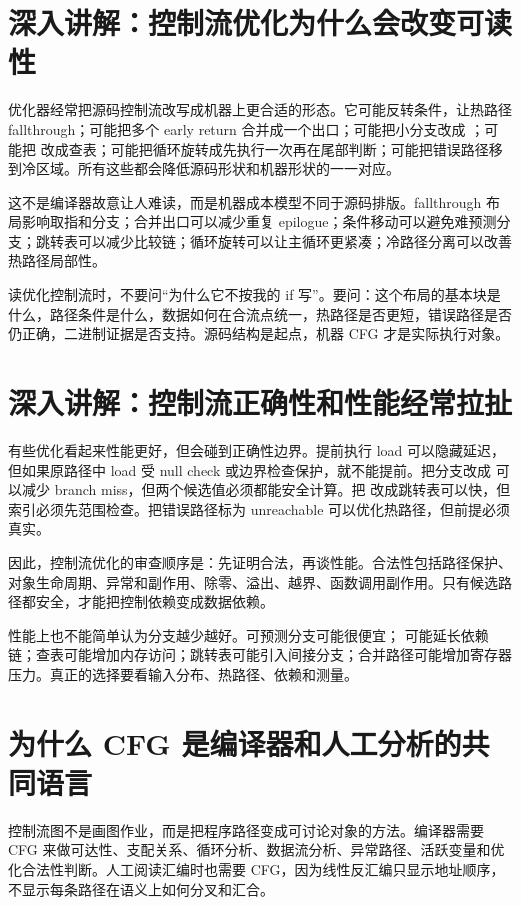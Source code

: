 \section{深入讲解：控制流优化为什么会改变可读性}

优化器经常把源码控制流改写成机器上更合适的形态。它可能反转条件，让热路径 fallthrough；可能把多个 early return 合并成一个出口；可能把小分支改成 ；可能把  改成查表；可能把循环旋转成先执行一次再在尾部判断；可能把错误路径移到冷区域。所有这些都会降低源码形状和机器形状的一一对应。

这不是编译器故意让人难读，而是机器成本模型不同于源码排版。fallthrough 布局影响取指和分支；合并出口可以减少重复 epilogue；条件移动可以避免难预测分支；跳转表可以减少比较链；循环旋转可以让主循环更紧凑；冷路径分离可以改善热路径局部性。

读优化控制流时，不要问“为什么它不按我的 if 写”。要问：这个布局的基本块是什么，路径条件是什么，数据如何在合流点统一，热路径是否更短，错误路径是否仍正确，二进制证据是否支持。源码结构是起点，机器 CFG 才是实际执行对象。

\section{深入讲解：控制流正确性和性能经常拉扯}

有些优化看起来性能更好，但会碰到正确性边界。提前执行 load 可以隐藏延迟，但如果原路径中 load 受 null check 或边界检查保护，就不能提前。把分支改成  可以减少 branch miss，但两个候选值必须都能安全计算。把  改成跳转表可以快，但索引必须先范围检查。把错误路径标为 unreachable 可以优化热路径，但前提必须真实。

因此，控制流优化的审查顺序是：先证明合法，再谈性能。合法性包括路径保护、对象生命周期、异常和副作用、除零、溢出、越界、函数调用副作用。只有候选路径都安全，才能把控制依赖变成数据依赖。

性能上也不能简单认为分支越少越好。可预测分支可能很便宜； 可能延长依赖链；查表可能增加内存访问；跳转表可能引入间接分支；合并路径可能增加寄存器压力。真正的选择要看输入分布、热路径、依赖和测量。

\section{为什么 CFG 是编译器和人工分析的共同语言}

控制流图不是画图作业，而是把程序路径变成可讨论对象的方法。编译器需要 CFG 来做可达性、支配关系、循环分析、数据流分析、异常路径、活跃变量和优化合法性判断。人工阅读汇编时也需要 CFG，因为线性反汇编只显示地址顺序，不显示每条路径在语义上如何分叉和汇合。

